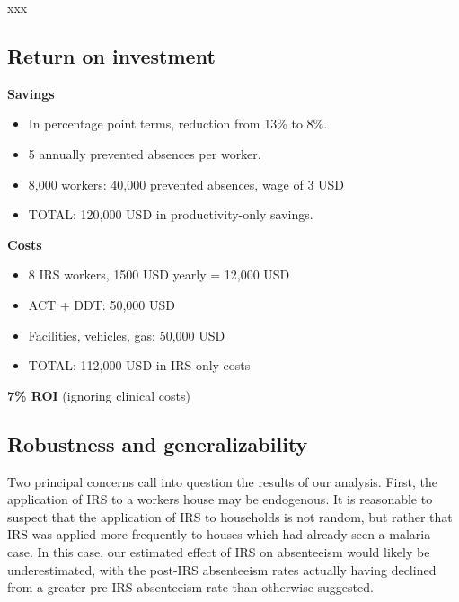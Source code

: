 \documentclass[]{article}
\providecommand{\tightlist}{%
  \setlength{\itemsep}{0pt}\setlength{\parskip}{0pt}}
\begin{document}
xxx

\subsection{Return on investment}\label{return-on-investment}


\textbf{Savings}

\begin{itemize}
\tightlist
\item
  In percentage point terms, reduction from 13\% to 8\%.\\
\item
  5 annually prevented absences per worker.\\
\item
  8,000 workers: 40,000 prevented absences, wage of 3 USD
\item
  TOTAL: 120,000 USD in productivity-only savings.
\end{itemize}

\textbf{Costs}

\begin{itemize}
\tightlist
\item
  8 IRS workers, 1500 USD yearly = 12,000 USD\\
\item
  ACT + DDT: 50,000 USD
\item
  Facilities, vehicles, gas: 50,000 USD\\
\item
  TOTAL: 112,000 USD in IRS-only costs
\end{itemize}

\textbf{7\% ROI} (ignoring clinical costs)

\newpage

\subsection{Robustness and
generalizability}\label{robustness-and-generalizability}

Two principal concerns call into question the results of our analysis.
First, the application of IRS to a workers house may be
endogenous.
It is reasonable to suspect that the application of IRS to households is
not random, but rather that IRS was applied more frequently to houses
which had already seen a malaria case. In this case, our estimated
effect of IRS on absenteeism would likely be underestimated, with the
post-IRS absenteeism rates actually having declined from a greater
pre-IRS absenteeism rate than otherwise suggested.
\end{document}

